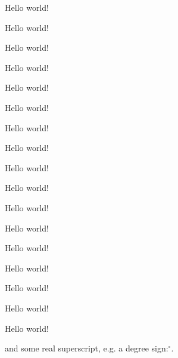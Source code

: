 \documentclass{article}
\begin{document}
Hello world!

Hello world!

Hello world!

Hello world!

Hello world!

Hello world!

Hello world!

Hello world!

Hello world!

Hello world!

Hello world!

Hello world!

Hello world!

Hello world!

Hello world!

Hello world!

Hello world!

and some real superscript, e.g. a degree sign:$^\circ$.
\end{document}
